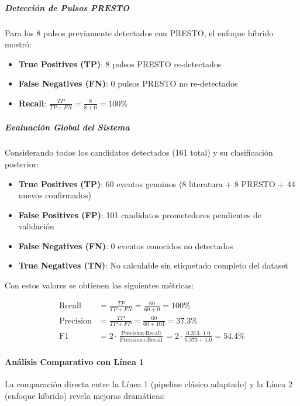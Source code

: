 \subparagraph{Detección de Pulsos PRESTO}

Para los 8 pulsos previamente detectados con PRESTO, el enfoque híbrido mostró:

\begin{itemize}
    \item \textbf{True Positives (TP)}: 8 pulsos PRESTO re-detectados
    \item \textbf{False Negatives (FN)}: 0 pulsos PRESTO no re-detectados
    \item \textbf{Recall}: $\frac{TP}{TP + FN} = \frac{8}{8 + 0} = 100\%$
\end{itemize}

\subparagraph{Evaluación Global del Sistema}

Considerando todos los candidatos detectados (161 total) y su clasificación posterior:

\begin{itemize}
    \item \textbf{True Positives (TP)}: 60 eventos genuinos (8 literatura + 8 PRESTO + 44 nuevos confirmados)
    \item \textbf{False Positives (FP)}: 101 candidatos prometedores pendientes de validación
    \item \textbf{False Negatives (FN)}: 0 eventos conocidos no detectados
    \item \textbf{True Negatives (TN)}: No calculable sin etiquetado completo del dataset
\end{itemize}

Con estos valores se obtienen las siguientes métricas:

\begin{align}
\text{Recall} &= \frac{TP}{TP + FN} = \frac{60}{60 + 0} = 100\% \\
\text{Precision} &= \frac{TP}{TP + FP} = \frac{60}{60 + 101} = 37.3\% \\
\text{F1} &= 2 \cdot \frac{\text{Precision} \cdot \text{Recall}}{\text{Precision} + \text{Recall}} = 2 \cdot \frac{0.373 \cdot 1.0}{0.373 + 1.0} = 54.4\%
\end{align}

\paragraph{Análisis Comparativo con Línea 1}

La comparación directa entre la Línea 1 (pipeline clásico adaptado) y la Línea 2 (enfoque híbrido) revela mejoras dramáticas:

